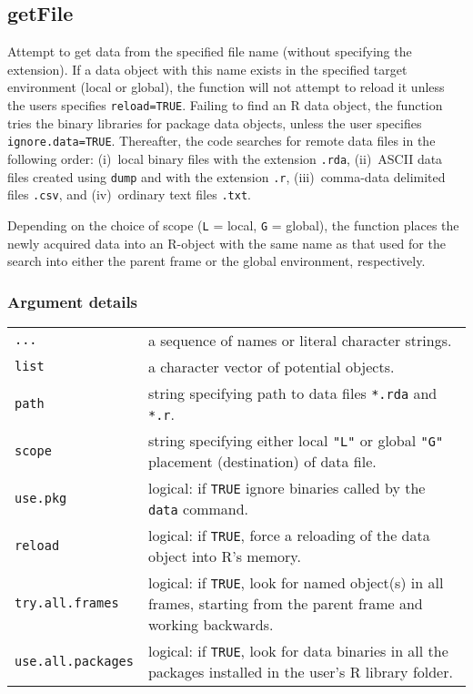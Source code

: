 \documentclass[letterpaper,12pt,fleqn]{article}
\def\tab{\hspace{0.5 in}}
\newcommand{\code}[1]{\small\texttt{#1}\normalsize}
\begin{document}
\subsection {getFile}

\tab Attempt to get data from the specified file name (without specifying the extension). If a data object with this name exists in the specified target environment (local or global), the function will not attempt to reload it unless the users specifies \code{reload=TRUE}. Failing to find an R data object, the function tries the binary libraries for package data objects, unless the user specifies \code{ignore.data=TRUE}. Thereafter, the code searches for remote data files in the following order: (i)~local binary files with the extension \code{.rda}, (ii)~ASCII data files created using \code{dump} and with the extension \code{.r}, (iii)~comma-data delimited files \code{.csv}, and (iv)~ordinary text files \code{.txt}.

\tab Depending on the choice of scope (\code{L} = local, \code{G} = global), the function places the newly acquired data into an R-object with the same name as that used for the search into either the parent frame or the global environment, respectively.

\subsubsection {Argument details}
\begin{longtable}[1]{l>{\raggedright\arraybackslash}p{} }
  \code{...}        &  a sequence of names or literal character strings.\\
  \code{list}       &  a character vector of potential objects.\\
  \code{path}       &  string specifying path to data files \code{*.rda} and \code{*.r}.\\
  \code{scope}      &  string specifying either local \code{"L"} or global \code{"G"} placement (destination) of data file.\\
  \code{use.pkg}    &  logical: if \code{TRUE} ignore binaries called by the \code{data} command.\\
  \code{reload}     &  logical: if \code{TRUE}, force a reloading of the data object into R's memory.\\
  \code{try.all.frames} &  logical: if \code{TRUE}, look for named object(s) in all frames, starting from the parent frame and working backwards.\\
  \code{use.all.packages}  &  logical: if \code{TRUE}, look for data binaries in all the packages installed in the user's R library folder.\\
\end{longtable}
\end{document}
